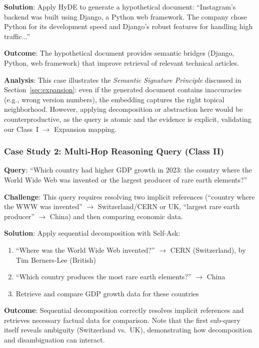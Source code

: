 \documentclass{article}
\begin{document}
\textbf{Solution}: Apply HyDE to generate a hypothetical document: ``Instagram's backend was built using Django, a Python web framework. The company chose Python for its development speed and Django's robust features for handling high traffic...''

\textbf{Outcome}: The hypothetical document provides semantic bridges (Django, Python, web framework) that improve retrieval of relevant technical articles.

\textbf{Analysis}: This case illustrates the \textit{Semantic Signature Principle} discussed in Section~\ref{sec:expansion}: even if the generated document contains inaccuracies (e.g., wrong version numbers), the embedding captures the right topical neighborhood. However, applying decomposition or abstraction here would be counterproductive, as the query is atomic and the evidence is explicit, validating our Class~I $\rightarrow$ Expansion mapping.

\subsubsection{Case Study 2: Multi-Hop Reasoning Query (Class II)}

\textbf{Query}: ``Which country had higher GDP growth in 2023: the country where the World Wide Web was invented or the largest producer of rare earth elements?''

\textbf{Challenge}: This query requires resolving two implicit references (``country where the WWW was invented'' $\rightarrow$ Switzerland/CERN or UK, ``largest rare earth producer'' $\rightarrow$ China) and then comparing economic data.

\textbf{Solution}: Apply sequential decomposition with Self-Ask:
\begin{enumerate}[leftmargin=*,nosep]
    \item ``Where was the World Wide Web invented?'' $\rightarrow$ CERN (Switzerland), by Tim Berners-Lee (British)
    \item ``Which country produces the most rare earth elements?'' $\rightarrow$ China
    \item Retrieve and compare GDP growth data for these countries
\end{enumerate}

\textbf{Outcome}: Sequential decomposition correctly resolves implicit references and retrieves necessary factual data for comparison. Note that the first sub-query itself reveals ambiguity (Switzerland vs.\ UK), demonstrating how decomposition and disambiguation can interact.
\end{document}

